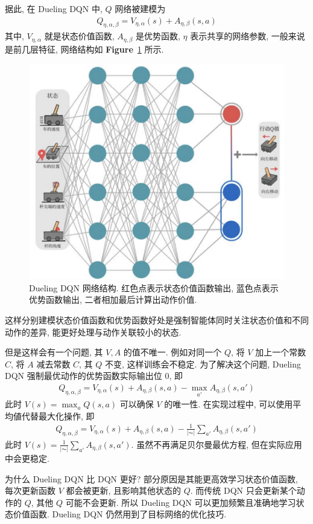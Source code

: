 据此, 在 Dueling DQN 中, $Q$ 网络被建模为
\begin{align*}
    Q_{\eta, \alpha, \beta} = V_{\eta, \alpha} (s) + A_{\eta, \beta} (s,a)
\end{align*}
其中, $V_{\eta, \alpha}$ 就是状态价值函数, $A_{\eta, \beta}$ 是优势函数, $\eta$ 表示共享的网络参数, 一般来说是前几层特征, 网络结构如 \textbf{Figure}~\ref{fig:Dueling DQN} 所示. 

\begin{figure}[!htb]
    \centering
    \includegraphics[width=0.618\linewidth]{pic/RL8/Dueling DQN.png}
    \caption{\label{fig:Dueling DQN}Dueling DQN 网络结构. 红色点表示状态价值函数输出, 蓝色点表示优势函数输出, 二者相加最后计算出动作价值.}
\end{figure}

这样分别建模状态价值函数和优势函数好处是强制智能体同时关注状态价值和不同动作的差异, 能更好处理与动作关联较小的状态. 

但是这样会有一个问题, 其 $V, A$ 的值不唯一. 例如对同一个 $Q$, 将 $V$ 加上一个常数 $C$, 将 $A$ 减去常数 $C$, 其 $Q$ 不变, 这样训练会不稳定. 为了解决这个问题, Dueling DQN 强制最优动作的优势函数实际输出位 0, 即
\begin{align*}
    Q_{\eta, \alpha, \beta} = V_{\eta, \alpha} (s) + A_{\eta, \beta} (s,a) - \max_{a'} A_{\eta, \beta}(s,a')
\end{align*} 
此时 $V(s)=\max_a Q(s,a)$ 可以确保 $V$ 的唯一性. 在实现过程中, 可以使用平均値代替最大化操作, 即
\begin{align*}
    Q_{\eta, \alpha, \beta} = V_{\eta, \alpha} (s) + A_{\eta, \beta} (s,a) - \frac{1}{|\AC|}\sum_{a'} A_{\eta, \beta} (s,a')
\end{align*}
此时 $V(s)=\frac{1}{|\AC|}\sum_{a'} A_{\eta, \beta} (s,a')$. 虽然不再满足贝尔曼最优方程, 但在实际应用中会更稳定. 

为什么 Dueling DQN 比 DQN 更好? 部分原因是其能更高效学习状态价值函数, 每次更新函数 $V$ 都会被更新, 且影响其他状态的 $Q$. 而传统 DQN 只会更新某个动作的 $Q$, 其他 $Q$ 可能不会更新. 所以 Dueling DQN 可以更加频繁且准确地学习状态价值函数. Dueling DQN 仍然用到了目标网络的优化技巧. 